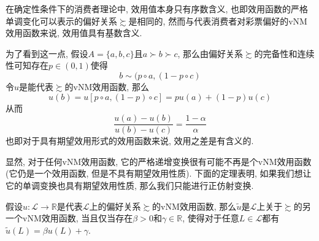 \documentclass[cn, 12pt, math=mtpro2, bibstyle=apa, blue]{elegantbook}
\newcommand{\R}{\mathbb{R}}
\begin{document}
\begin{example}
在确定性条件下的消费者理论中, 效用值本身只有序数含义, 也即效用函数的严格单调变化可以表示的偏好关系$\succsim$是相同的, 然而与代表消费者对彩票偏好的vNM效用函数来说, 效用值具有基数含义.

为了看到这一点, 假设$A=\{a,b,c\}$且$a\succ b \succ c$, 那么由偏好关系$\succsim$的完备性和连续性可知存在$p\in (0,1)$使得
$$b\sim (p\circ a, (1-p\circ c)$$
令$u$是能代表$\succsim$的vNM效用函数, 那么
$$u(b)=u[p\circ a, (1-p)\circ c]=pu(a)+(1-p)u(c)$$
从而
$$\frac{u(a)-u(b)}{u(b)-u(c)}=\frac{1-\alpha}{\alpha}$$
也即对于具有期望效用形式的效用函数来说, 效用之差是有含义的.

显然, 对于任何vNM效用函数, 它的严格递增变换很有可能不再是个vNM效用函数 (它仍是一个效用函数, 但是不具有期望效用性质). 下面的定理表明, 如果我们想让它的单调变换也具有期望效用性质, 那么我们只能进行正仿射变换.
\end{example}
\begin{theorem}
  假设$u:\mathscr{L}\to\R$是代表$\mathscr{L}$上的偏好关系$\succsim$的vNM效用函数, 那么$\tilde{u}$是$\mathscr{L}$上关于$\succsim$的另一个vNM效用函数, 当且仅当存在$\beta>0$和$\gamma\in\R$, 使得对于任意$L\in\mathscr{L}$都有$\tilde{u}(L)=\beta u(L)+\gamma$.
\end{theorem}
\end{document}
